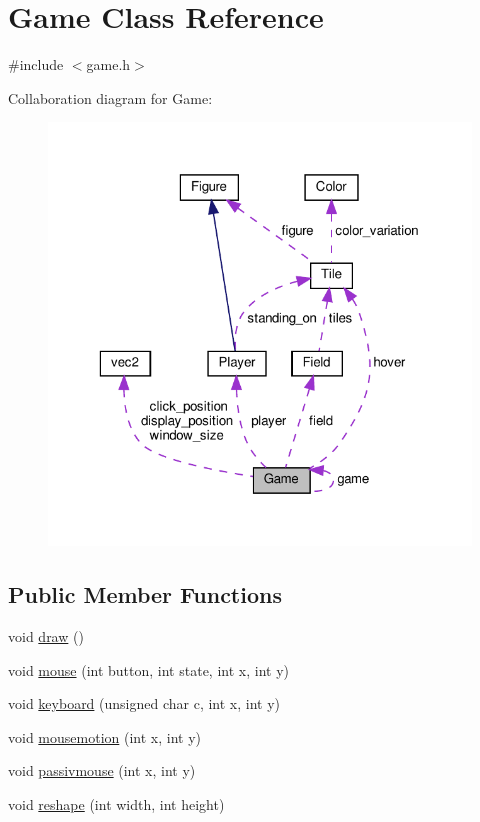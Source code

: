 \hypertarget{classGame}{}\section{Game Class Reference}
\label{classGame}


{\ttfamily \#include $<$game.\+h$>$}



Collaboration diagram for Game\+:
\nopagebreak
\begin{figure}[H]
\begin{center}
\leavevmode
\includegraphics[width=323pt]{de/da7/classGame__coll__graph}
\end{center}
\end{figure}
\subsection*{Public Member Functions}
\begin{DoxyCompactItemize}
\item 
void \hyperlink{classGame_a6d54497ce3a66f6dd45eacfdccc8d0bd}{draw} ()
\item 
void \hyperlink{classGame_a0d2c45b51376f114fe8962d272f26c1f}{mouse} (int button, int state, int x, int y)
\item 
void \hyperlink{classGame_a6c5b84f9376ef6ce1ed2c0eeb551ff71}{keyboard} (unsigned char c, int x, int y)
\item 
void \hyperlink{classGame_af56f813ded5dbb01083c3e673fa2090b}{mousemotion} (int x, int y)
\item 
void \hyperlink{classGame_a542105a9f25169e14ca19a842d74789d}{passivmouse} (int x, int y)
\item 
void \hyperlink{classGame_ac173432416c0c8d549080c50a2fddf71}{reshape} (int width, int height)
\end{DoxyCompactItemize}
